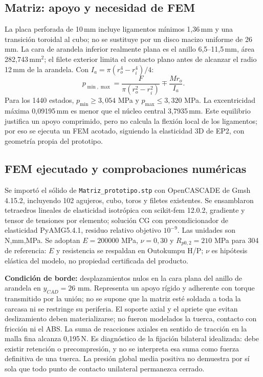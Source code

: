 \subsection{Matriz: apoyo y necesidad de FEM}
La placa perforada de 10\,mm incluye ligamentos mínimos 1,36\,mm y una transición
toroidal al cubo; no se sustituye por un disco macizo uniforme de 26\,mm.
La cara de arandela inferior realmente plana es el anillo 6,5--11,5\,mm,
área 282,743\,mm$^2$; el filete exterior limita el contacto plano antes de
alcanzar el radio 12\,mm de la arandela. Con $I_a=\pi(r_o^4-r_i^4)/4$:
\begin{equation}
 p_{\min,\max}=\frac{F}{\pi(r_o^2-r_i^2)}\mp\frac{Mr_o}{I_a}.
\end{equation}
Para los 1440 estados, $p_{\min}\geq3,054$ MPa y $p_{\max}\leq3,320$ MPa.
La excentricidad máxima 0,09195\,mm es menor que el núcleo central 3,7935\,mm.
Este equilibrio justifica un apoyo comprimido, pero no calcula la flexión
local de los ligamentos; por eso se ejecuta un FEM acotado, siguiendo la
elasticidad 3D de EP2, con geometría propia del prototipo.

\subsection{FEM ejecutado y comprobaciones numéricas}
Se importó el sólido de \texttt{Matriz\_prototipo.stp} con OpenCASCADE de
Gmsh 4.15.2, incluyendo 102 agujeros, cubo, toros y filetes existentes.
Se ensamblaron tetraedros lineales de elasticidad isotrópica con
scikit-fem 12.0.2, gradiente y tensor de tensiones por elemento; solución
CG con precondicionador de elasticidad PyAMG5.4.1, residuo relativo objetivo
$10^{-9}$. Las unidades son N,mm,MPa. Se adoptan $E=200000$ MPa,
$\nu=0,30$ y $R_{p0,2}=210$ MPa para 304 de referencia: $E$ y resistencia
se respaldan en Outokumpu H/P\cite{outokumpu_core_2026}; $\nu$ es hipótesis
elástica del modelo, no propiedad certificada del producto.

\textbf{Condición de borde:} desplazamientos nulos en la cara plana del
anillo de arandela en $y_{CAD}=26$ mm. Representa un apoyo rígido y adherente
con torque transmitido por la unión; no se supone que la matriz esté
soldada a toda la carcasa ni se restringe su periferia. El soporte axial
y el apriete que evitan deslizamiento deben materializarse; no fueron
modelados la tuerca, contacto con fricción ni el ABS. La suma de reacciones
axiales en sentido de tracción en la malla fina alcanza 0,195\,N.
Es diagnóstico de la fijación bilateral idealizada: debe existir retención
o precompresión, y no se interpreta esa suma como fuerza definitiva de una
tuerca. La presión global media positiva no demuestra por sí sola que
todo punto de contacto unilateral permanezca cerrado.

